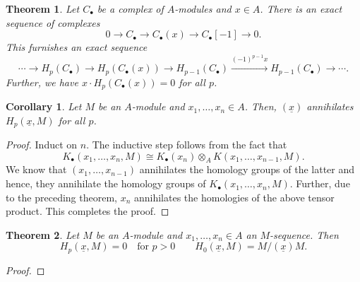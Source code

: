\documentclass[12pt]{article}
\theoremstyle{thmstyle}
\newtheorem{theorem}{Theorem}[section]
\theoremstyle{defstyle}
\newtheorem*{corollary}{Corollary}
\begin{document}
\begin{theorem}
    Let $C_\bullet$ be a complex of $A$-modules and $x\in A$. There is an exact sequence of complexes 
    \begin{equation*}
        0\longrightarrow C_\bullet\longrightarrow C_\bullet(x)\longrightarrow C_\bullet[-1]\longrightarrow 0.
    \end{equation*}
    This furnishes an exact sequence 
    \begin{equation*}
        \cdots\to H_p(C_\bullet)\to H_p(C_\bullet(x))\to H_{p - 1}(C_\bullet)\xrightarrow{(-1)^{p - 1}x} H_{p - 1}(C_\bullet)\to\cdots.
    \end{equation*}
    Further, we have $x\cdot H_{p}(C_\bullet(x)) = 0$ for all $p$.
\end{theorem}

\begin{corollary}
    Let $M$ be an $A$-module and $x_1,\dots,x_n\in A$. Then, $(\underline x)$ annihilates $H_p(\underline x, M)$ for all $p$.
\end{corollary}
\begin{proof}
    Induct on $n$. The inductive step follows from the fact that 
    \begin{equation*}
        K_\bullet(x_1,\dots, x_n, M)\cong K_\bullet(x_n)\otimes_A K(x_1,\dots, x_{n - 1}, M).
    \end{equation*}
    We know that $(x_1,\dots, x_{n - 1})$ annihilates the homology groups of the latter and hence, they annihilate the homology groups of $K_\bullet(x_1,\dots, x_n, M)$. Further, due to the preceding theorem, $x_n$ annihilates the homologies of the above tensor product. This completes the proof.
\end{proof}

\begin{theorem}
    Let $M$ be an $A$-module and $x_1,\dots,x_n\in A$ an $M$-sequence. Then 
    \begin{equation*}
        H_p(\underline x, M) = 0\quad\text{for } p > 0\qquad H_0(\underline x, M) = M/(\underline x)M.
    \end{equation*}
\end{theorem}
\begin{proof}
    
\end{proof}
\end{document}
